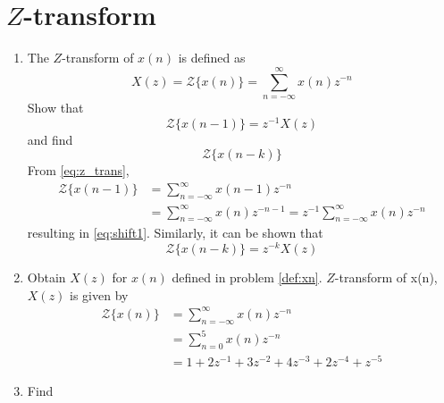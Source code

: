 \documentclass[journal,12pt,twocolumn]{IEEEtran}
\renewcommand\thesection{\arabic{section}}
\begin{document}
\section{$Z$-transform}
\begin{enumerate}[label=\thesection.\arabic*]
	\item The $Z$-transform of $x(n)$ is defined as
	\begin{equation}
		\label{eq:z_trans}
		X(z)={\mathcal {Z}}\{x(n)\}=\sum _{n=-\infty }^{\infty }x(n)z^{-n}
	\end{equation}
	Show that
	\begin{equation}
		\label{eq:shift1}
		{\mathcal {Z}}\{x(n-1)\} = z^{-1}X(z)
	\end{equation}
	and find
	\begin{equation}
		{\mathcal {Z}}\{x(n-k)\} 
	\end{equation}
	\solution From \eqref{eq:z_trans},
	\begin{align}
		{\mathcal {Z}}\{x(n-1)\} &=\sum _{n=-\infty }^{\infty }x(n-1)z^{-n}
		\\
		&=\sum _{n=-\infty }^{\infty }x(n)z^{-n-1} = z^{-1}\sum _{n=-\infty }^{\infty }x(n)z^{-n}
	\end{align}
	resulting in \eqref{eq:shift1}. Similarly, it can be shown that
	\begin{equation}
		\label{eq:z_trans_shift}
		{\mathcal {Z}}\{x(n-k)\} = z^{-k}X(z)
	\end{equation}
	\item Obtain $X(z)$ for $x(n)$ defined in problem 
	\ref{def:xn}.
	\solution $Z$-transform of x(n),$X(z)$ is given by
	\begin{align}
		\mathcal{Z}\{x(n)\}&=\sum_{n=-\infty}^\infty x(n)z^{-n}\\
		&=\sum_{n=0}^5x(n)z^{-n}\\
		&=1+2z^{-1}+3z^{-2}+4z^{-3}+2z^{-4}+z^{-5}
	\end{align}
	\item Find

\end{enumerate}
\end{document}
